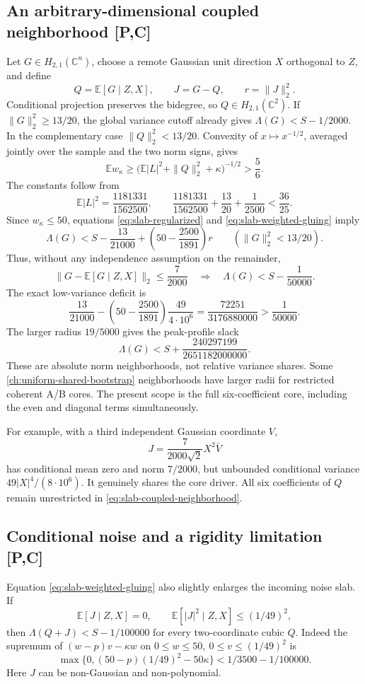 \subsection{An arbitrary-dimensional coupled neighborhood [P,C]}
Let \(G\in H_{2,1}(\mathbb C^n)\), choose a remote Gaussian unit
direction \(X\) orthogonal to \(Z\), and define
\[
Q=\mathbb E[G\mid Z,X],\qquad J=G-Q,\qquad r=\|J\|_2^2.
\]
Conditional projection preserves the bidegree, so
\(Q\in H_{2,1}(\mathbb C^2)\).
If \(\|G\|_2^2\ge13/20\), the global variance cutoff already gives
\(\Lambda(G)<S-1/2000\).
In the complementary case \(\|Q\|_2^2<13/20\).
Convexity of \(x\mapsto x^{-1/2}\), averaged jointly over the sample
and the two norm signs, gives
\[
\mathbb Ew_\kappa
\ge\big(\mathbb E|L|^2+\|Q\|_2^2+\kappa\big)^{-1/2}
>\frac56.
\]
The constants follow from
\[
\mathbb E|L|^2=\frac{1181331}{1562500},
\qquad
\frac{1181331}{1562500}+\frac{13}{20}+\frac1{2500}
<\frac{36}{25}.
\]
Since \(w_\kappa\le50\), equations
\eqref{eq:slab-regularized} and \eqref{eq:slab-weighted-gluing} imply
\begin{equation}
\Lambda(G)<S-\frac{13}{21000}
+\left(50-\frac{2500}{1891}\right)r
\qquad(\|G\|_2^2<13/20).
\label{eq:slab-neighborhood-cost}
\end{equation}
Thus, without any independence assumption on the remainder,
\begin{equation}
\boxed{\|G-\mathbb E[G\mid Z,X]\|_2\le\frac7{2000}
\quad\Longrightarrow\quad
\Lambda(G)<S-\frac1{50000}.}
\label{eq:slab-coupled-neighborhood}
\end{equation}
The exact low-variance deficit is
\[
\frac{13}{21000}
-\left(50-\frac{2500}{1891}\right)\frac{49}{4\cdot10^6}
=\frac{72251}{3176880000}>\frac1{50000}.
\]
The larger radius \(19/5000\) gives the peak-profile slack
\[
\Lambda(G)<S+\frac{240297199}{2651182000000}.
\]
These are absolute norm neighborhoods, not relative variance shares.
Some \autoref{ch:uniform-shared-bootstrap} neighborhoods have larger radii for restricted coherent
A/B cores. The present scope is the full six-coefficient core, including
the even and diagonal terms simultaneously.

For example, with a third independent Gaussian coordinate \(V\),
\[
J=\frac{7}{2000\sqrt2}X^2\bar V
\]
has conditional mean zero and norm \(7/2000\), but unbounded
conditional variance \(49|X|^4/(8\cdot10^6)\).
It genuinely shares the core driver. All six coefficients of \(Q\)
remain unrestricted in \eqref{eq:slab-coupled-neighborhood}.

\subsection{Conditional noise and a rigidity limitation [P,C]}
Equation \eqref{eq:slab-weighted-gluing} also slightly enlarges the
incoming noise slab. If
\[
\mathbb E[J\mid Z,X]=0,\qquad
\mathbb E[|J|^2\mid Z,X]\le(1/49)^2,
\]
then \(\Lambda(Q+J)<S-1/100000\) for every two-coordinate cubic \(Q\).
Indeed the supremum of \((w-p)v-\kappa w\) on
\(0\le w\le50,\ 0\le v\le(1/49)^2\) is
\[
\max\{0,(50-p)(1/49)^2-50\kappa\}<1/3500-1/100000.
\]
Here \(J\) can be non-Gaussian and non-polynomial.

